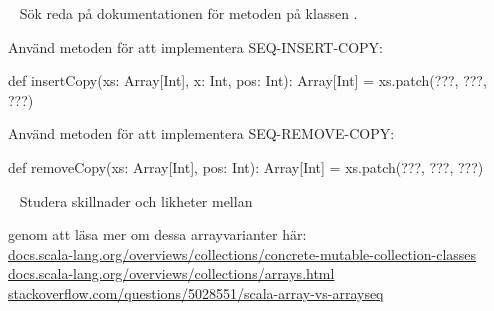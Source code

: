 {\AdvancedTasks %

\SOLUTION


\TaskSolved \what




\AdvancedTasks %



\QUESTEND









\QUESTBEGIN

\Task  \what~ Sök reda på dokumentationen för metoden  på klassen .

\Subtask Använd metoden  för att implementera SEQ-INSERT-COPY:
\begin{Code}
def insertCopy(xs: Array[Int], x: Int, pos: Int): Array[Int] =
  xs.patch(???, ???, ???)
\end{Code}

\Subtask Använd metoden  för att  implementera SEQ-REMOVE-COPY:
\begin{Code}
def removeCopy(xs: Array[Int], pos: Int): Array[Int] =
  xs.patch(???, ???, ???)
\end{Code}

\SOLUTION


\TaskSolved \what


\SubtaskSolved

\SubtaskSolved



\QUESTEND









\QUESTBEGIN

\Task  \what~ Studera skillnader och likheter mellan

\Subtask {}

\Subtask {}

\Subtask {}

\noindent genom att läsa mer om dessa arrayvarianter här: \\
\href{http://docs.scala-lang.org/overviews/collections/concrete-mutable-collection-classes}{docs.scala-lang.org/overviews/collections/concrete-mutable-collection-classes} \\
\href{http://docs.scala-lang.org/overviews/collections/arrays.html}{docs.scala-lang.org/overviews/collections/arrays.html}  \\
\href{http://stackoverflow.com/questions/5028551/scala-array-vs-arrayseq}{stackoverflow.com/questions/5028551/scala-array-vs-arrayseq}


}
